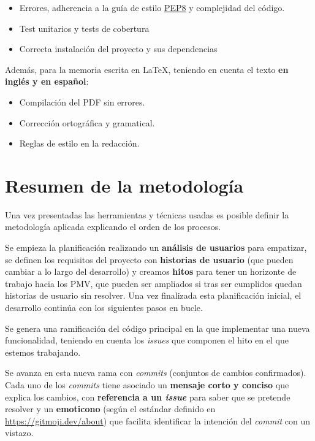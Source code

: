 \begin{itemize}
	\item{Errores, adherencia a la guía de estilo \href{https://peps.python.org/pep-0008/}{PEP8} y complejidad del código.}
	\item{Test unitarios y tests de cobertura}
	\item{Correcta instalación del proyecto y sus dependencias}
\end{itemize}

Además, para la memoria escrita en LaTeX, teniendo en cuenta el texto \textbf{en inglés y en español}:
\begin{itemize}
	\item{Compilación del PDF sin errores.}
	\item{Corrección ortográfica y gramatical.}
	\item{Reglas de estilo en la redacción.}
\end{itemize}


\section{Resumen de la metodología}

Una vez presentadas las herramientas y técnicas usadas es posible definir la metodología aplicada explicando el orden de los procesos.

Se empieza la planificación realizando un \textbf{análisis de usuarios} para empatizar, se definen los requisitos del proyecto con \textbf{historias de usuario} (que pueden cambiar a lo largo del desarrollo) y creamos \textbf{hitos} para tener un horizonte de trabajo hacia los PMV, que pueden ser ampliados si tras ser cumplidos quedan historias de usuario sin resolver. Una vez finalizada esta planificación inicial, el desarrollo continúa con los siguientes pasos en bucle. 

Se genera una ramificación del código principal en la que implementar una nueva funcionalidad, teniendo en cuenta los \textit{issues} que componen el hito en el que estemos trabajando.

Se avanza en esta nueva rama con \textit{commits} (conjuntos de cambios confirmados). Cada uno de los \textit{commits} tiene asociado un \textbf{mensaje corto y conciso} que explica los cambios, con \textbf{referencia a un \textit{issue}} para saber que se pretende resolver y un \textbf{emoticono} (según el estándar definido en \url{https://gitmoji.dev/about}) que facilita identificar la intención del \textit{commit} con un vistazo.

